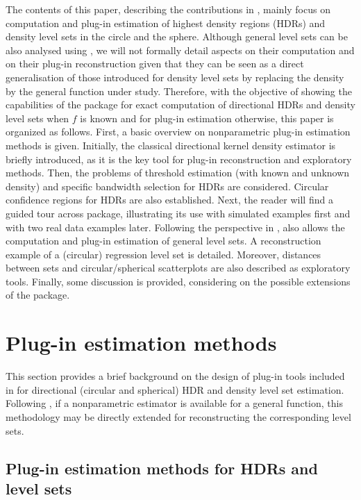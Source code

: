 The contents of this paper, describing the contributions in , mainly focus on computation and plug-in estimation of highest density regions (HDRs) and density level sets in the circle and the sphere. Although general level sets can be also analysed using , we will not formally detail aspects on their computation and on their plug-in reconstruction given that they can be seen as a direct generalisation of those introduced for density level sets by replacing the density by the general function under study. Therefore, with the objective of showing the capabilities of the  package for exact computation of directional HDRs and density level sets when $f$ is known and for plug-in estimation otherwise, this paper is organized as follows. First, a basic overview on nonparametric plug-in estimation methods is given. Initially, the classical directional kernel density estimator is briefly introduced, as it is the key tool for plug-in reconstruction and exploratory methods. Then, the problems of threshold estimation (with known and unknown density) and specific bandwidth selection for HDRs are considered.  Circular confidence regions for HDRs are also established. Next, the reader will find a guided tour across  package, illustrating its use with simulated examples first and with two real data examples later. Following the perspective in \cite{cuevas2006plug},  also allows the computation and plug-in estimation of general level sets. A reconstruction example of a (circular) regression level set is detailed. Moreover, distances between sets and circular/spherical scatterplots are also described as exploratory tools. Finally, some discussion is provided, considering on the possible extensions of the package.


\section{Plug-in estimation methods}\label{sec:2}
This section provides a brief background on the design of plug-in tools included in  for directional (circular and spherical) HDR and density level set estimation. Following \cite{cuevas2006plug}, if a nonparametric estimator is available for a general function, this methodology may be directly extended for reconstructing the corresponding level sets.

\subsection{Plug-in estimation methods for HDRs and level sets}\label{HDRsplugin}

